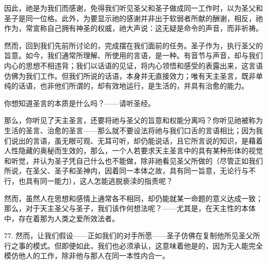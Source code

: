 因此，祂是为我们而感谢，免得我们听见圣父和圣子做成同一工作时，以为圣父和圣子是同一位格。此外，为要显示祂的感谢并非出于软弱者所献的酬谢，相反，祂作为，常宣称自己拥有神圣的权威，祂大声说：这无疑是命令的声音，而非祈祷。\par

\par

然而，回到我们先前所讨论的，完成摆在我们面前的任务。圣子作为，执行圣父的旨意。如今，我们通常所理解、所使用的言语，是一种。有音节与声音，却与我们内心的思想不相违背；我们以话语的见证，将内心领悟和感受的表露出来，这言语仿佛为我们工作。但我们所说的话语，本身并无直接效力；唯有天主圣言，既非单纯的话语，也非他们所谓的，却有效地运行，是生活的，并具有治愈的能力。\par

你想知道圣言的本质是什么吗？——请听圣经。\par

那么，你听见了天主圣言，还要将祂与圣父的旨意和权能分离吗？你听见祂被称为生活的圣言、治愈的圣言——那么就不要设法将祂与我们口舌的言语相比；因为我们说出的言语，虽无眼可观、无耳可听，却仍能说话，且它所言说的知识，是藉着人性隐藏的奥秘而生效的，那么，一个人若要求天主圣言中的具有某种形体的视觉和听觉，并认为圣子凭自己什么也不能做，除非祂看见圣父所做的（尽管正如我们所说，在圣父、圣子和圣神内，因着同一本体之故，具有同一旨意，无论行与不行，也具有同一能力），这人怎能逃脱亵渎的指责呢？\par

然而，虽然人在思想和感情上通常各不相同，却仍能就某一命题的意义达成一致；那么，对于天主圣父与圣子，我们该作何想法呢？——尤其是，在天主性的本体中，存在着那为人类之爱所效法者。\par

77. 然而，让我们假设——正如我们的对手所愿——圣子仿佛在复制他所见圣父所行之事的模式。但即便如此，我们也必须承认，这意味着他是的，因为无人能完全模仿他人的工作，除非他与那人在同一本性内合一。\par

\par

